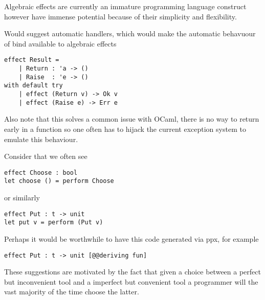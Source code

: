 Algebraic effects are currently an
immature programming language construct
however have immense potential because of 
their simplicity and flexibility.

Would suggest automatic handlers,
which would make the automatic behavuour of bind
available to algebraic effects
\begin{verbatim}
effect Result =
    | Return : 'a -> ()
    | Raise  : 'e -> ()
with default try
    | effect (Return v) -> Ok v
    | effect (Raise e) -> Err e
\end{verbatim}
Also note that this solves a common issue with
OCaml, there is no way to return early in a function
so one often has to hijack the current exception
system to emulate this behaviour.

Consider that we often see
\begin{verbatim}
effect Choose : bool
let choose () = perform Choose\end{verbatim}
or similarly
\begin{verbatim}
effect Put : t -> unit
let put v = perform (Put v)
\end{verbatim}
Perhaps it would be worthwhile to have this code
generated via ppx, for example
\begin{verbatim}
effect Put : t -> unit [@@deriving fun]
\end{verbatim}

These suggestions are motivated by the fact that
given a choice between a perfect but inconvenient tool
and a imperfect but convenient tool
a programmer will the vast majority of the time choose the latter.


